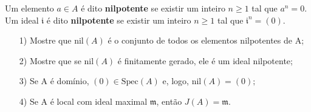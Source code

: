 \documentclass[AlgebraII/algebraII_notes.tex]{subfiles}
\begin{document}
\begin{def*}
	Um elemento \(a\in A\) é dito \textbf{nilpotente} se existir um inteiro \(n\geq 1\) tal que \(a^{n} = 0.\) Um ideal
	\(\mathfrak{i}\) é dito \textbf{nilpotente} se existir um inteiro \(n\geq 1\) tal que \(\mathfrak{i}^{n} = (0).\)
\end{def*}
\begin{prop*}[Exercício]
	\begin{itemize}
		\item[1)] Mostre que \(\mathrm{nil}(A)\) é o conjunto de todos os elementos nilpotentes de A;
		\item[2)] Mostre que se \(\mathrm{nil}(A)\) é finitamente gerado, ele é um ideal nilpotente;
		\item[3)] Se A é domínio, \((0)\in \mathrm{Spec}(A)\) e, logo, \(\mathrm{nil}(A) = (0);\)
		\item[4)] Se A é local com ideal maximal \(\mathfrak{m}\), então \(J(A) = \mathfrak{m}.\)
	\end{itemize}
\end{prop*}
\end{document}
